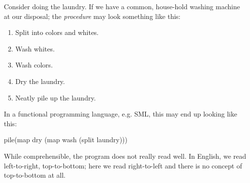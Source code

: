 Consider doing the laundry. If we have a common, house-hold washing machine at
our disposal; the {\it procedure} may look something like this:

\begin{enumerate}

\item Split into colors and whites.

\item Wash whites.

\item Wash colors.

\item Dry the laundry.

\item Neatly pile up the laundry.

\end{enumerate}

In a functional programming language, e.g. SML, this may end up looking like
this:

pile(map dry (map wash (split laundry)))

While comprehensible, the program does not really read well. In English, we
read left-to-right, top-to-bottom; here we read right-to-left and there is no
concept of top-to-bottom at all.

